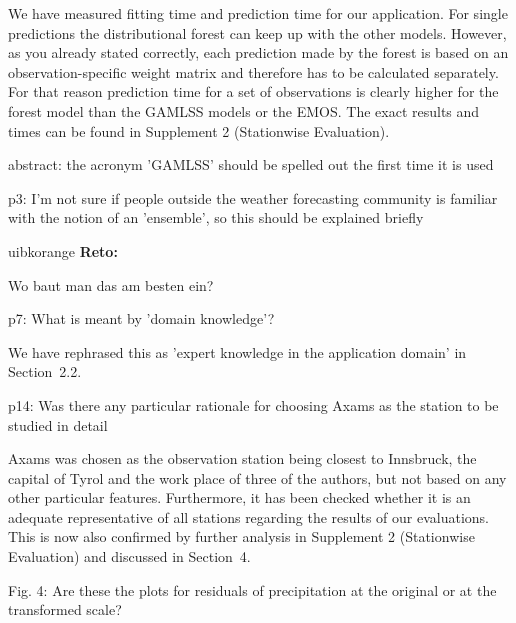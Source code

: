 \documentclass[american,foldmarks=false,noconfig]{uibklttr}
\newenvironment{review}{\fontshape{\itdefault}\fontseries{\bfdefault} \selectfont \smallskip}{\par}
\newenvironment{reto}{
    \begin{color}{uibkorange}
    \textbf{Reto:~}
        \itshape
}{
    \end{color}
}
\begin{document}
We have measured fitting time and prediction time for our 
application. For single predictions the distributional forest 
can keep up with the other models. However, as you already 
stated correctly, each prediction made by the forest is based 
on an observation-specific weight matrix and therefore has to 
be calculated separately. For that reason prediction time for a 
set of observations is clearly higher for the forest model than 
the GAMLSS models or the EMOS. The exact results and times can 
be found in Supplement 2 (Stationwise Evaluation).


\begin{review}
abstract: the acronym 'GAMLSS' should be spelled out the first 
time it is used
\end{review}

\begin{review}
p3: I'm not sure if people outside the weather forecasting 
community is familiar with the notion of an 'ensemble', so 
this should be explained briefly
\end{review}

\begin{reto}
Wo baut man das am besten ein?
\end{reto}


\begin{review}
p7: What is meant by 'domain knowledge'?
\end{review}

We have rephrased this as 'expert knowledge in the application domain'
in Section~2.2.


\begin{review}
p14: Was there any particular rationale for choosing Axams 
as the station to be studied in detail
\end{review}

Axams was chosen as the observation station being closest 
to Innsbruck, the capital of Tyrol and the work place of 
three of the authors, but not based on any other particular 
features. Furthermore, it has been checked whether it 
is an adequate representative of all stations regarding 
the results of our evaluations. This is now also 
confirmed by further analysis in Supplement 2 (Stationwise Evaluation) 
and discussed in Section~4.

\begin{review}
Fig. 4: Are these the plots for residuals of precipitation 
at the original or at the transformed scale?
\end{review}
\end{document}
